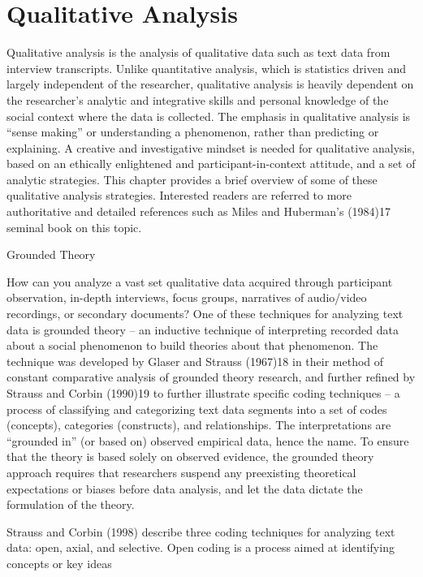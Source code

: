 \section{Qualitative Analysis}
Qualitative analysis is the analysis of qualitative data such as text data from interview transcripts. Unlike quantitative analysis, which is statistics driven and largely independent of the researcher, qualitative analysis is heavily dependent on the researcher’s analytic and integrative skills and personal knowledge of the social context where the data is collected. The emphasis in qualitative analysis is “sense making” or understanding a phenomenon, rather than predicting or explaining. A creative and investigative mindset is needed for qualitative analysis, based on an ethically enlightened and participant-in-context attitude, and a set of analytic strategies. This chapter provides a brief overview of some of these qualitative analysis strategies. Interested readers are referred to more authoritative and detailed references such as Miles and Huberman’s (1984)17 seminal book on this topic. 

Grounded Theory

How can you analyze a vast set qualitative data acquired through participant observation, in-depth interviews, focus groups, narratives of audio/video recordings, or secondary documents? One of these techniques for analyzing text data is grounded theory – an inductive technique of interpreting recorded data about a social phenomenon to build theories about that phenomenon. The technique was developed by Glaser and Strauss (1967)18 in their method of constant comparative analysis of grounded theory research, and further refined by Strauss and Corbin (1990)19 to further illustrate specific coding techniques – a process of classifying and categorizing text data segments into a set of codes (concepts), categories (constructs), and relationships. The interpretations are “grounded in” (or based on) observed empirical data, hence the name. To ensure that the theory is based solely on observed evidence, the grounded theory approach requires that researchers suspend any preexisting theoretical expectations or biases before data analysis, and let the data dictate the formulation of the theory.

Strauss and Corbin (1998) describe three coding techniques for analyzing text data: open, axial, and selective. Open coding is a process aimed at identifying concepts or key ideas 

